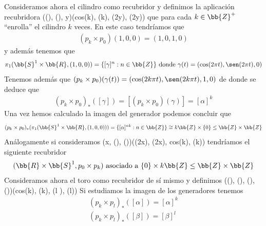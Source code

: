 \begin{ejemplo}
\begin{enumerate}
        Consideramos ahora el cilindro como recubridor y definimos la aplicación recubridora
             {(\cos(\theta), \sen(\theta), y)}{(cos(k\theta), \sen(k\theta), \cos(2\pi y), \sen(2\pi y))}
        que para cada $k\in \bb{Z}^+$ ``enrolla'' el cilindro $k$ veces. 
        En este caso tendríamos que 
        \begin{gather*}
            (p_k\times p_0)(1,0,0) = (1,0,1,0)
        \end{gather*}
        y además tenemos que 
        \begin{gather*}
            \pi_1(\bb{S}^1 \times \bb{R}, (1,0,0)) = \{[\gamma]^n : n\in \bb{Z}\} \text{ donde } \gamma(t)=(\cos(2\pi t), \sen(2\pi t), 0)
        \end{gather*}
        Tenemos además que $(p_k\times p_0)(\gamma(t)) = (\cos(2k\pi t), \sen(2k\pi t), 1, 0)$ de donde se deduce que
        \begin{gather*}
            (p_k \times p_0)_*([\gamma]) = [(p_k\times p_0)(\gamma)]
            = [\alpha]^k 
        \end{gather*}
        Una vez hemos calculado la imagen del generador podemos concluir que 
        \begin{gather*}
            (p_k\times p_0)_*(\pi_1(\bb{S}^1 \times \bb{R}, (1,0,0))) = \{[\alpha]^{nk} : n\in \bb{Z}\} \cong k\bb{Z}\times \{0\} \leq \bb{Z} \times \bb{Z}
        \end{gather*}
        Análogamente si consideramos 
             {(x,  \cos(\theta), \sen(\theta))}{(\cos(2\pi x), \sen(2\pi x), cos(k\theta), \sen(k\theta))}
        tendríamos el siguiente recubridor
        \begin{gather*}
            (\bb{R}\times \bb{S}^1, p_0\times p_k) \text{ asociado a } \{0\}\times k\bb{Z} \leq \bb{Z}\times \bb{Z}
        \end{gather*}
        Consideramos ahora el toro como recubridor de sí mismo y definimos
             {(\cos(\theta), \sen(\theta), \cos(\varphi), \sen(\varphi))}{(cos(k\theta), \sen(k\theta), \cos(l \varphi), \sen(l\varphi))}
        Si estudiamos la imagen de los generadores tenemos 
        \begin{gather*}
            (p_k\times p_l)_*([\alpha]) = [\alpha]^k\\
            (p_k\times p_l)_*([\beta]) = [\beta]^l

\end{gather*}
\end{enumerate}
\end{ejemplo}
